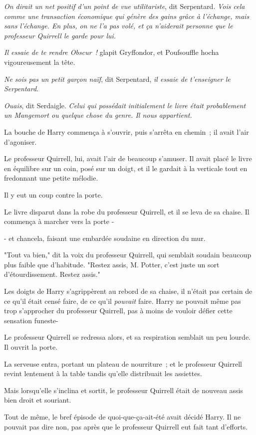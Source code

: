 \emph{On dirait un net positif d'un point de vue utilitariste}, dit Serpentard. \emph{Vois cela comme une transaction économique qui génère des gains grâce à l'échange, mais sans l'échange. En plus, on ne l'a pas volé, et ça n'aiderait personne que le professeur Quirrell le garde pour lui.}

\emph{Il essaie de te rendre Obscur~!} glapit Gryffondor, et Poufsouffle hocha vigoureusement la tête.

\emph{Ne sois pas un petit garçon naïf}, dit Serpentard, \emph{il essaie de t'enseigner le Serpentard}.

\emph{Ouais}, dit Serdaigle. \emph{Celui qui possédait initialement le livre était probablement un Mangemort ou quelque chose du genre. Il nous appartient.}

La bouche de Harry commença à s'ouvrir, puis s'arrêta en chemin~; il avait l'air d'agoniser.

Le professeur Quirrell, lui, avait l'air de beaucoup s'amuser. Il avait placé le livre en équilibre sur un coin, posé sur un doigt, et il le gardait à la verticale tout en fredonnant une petite mélodie.

Il y eut un coup contre la porte.

Le livre disparut dans la robe du professeur Quirrell, et il se leva de sa chaise. Il commença à marcher vers la porte -

- et chancela, faisant une embardée soudaine en direction du mur.

"Tout va bien," dit la voix du professeur Quirrell, qui semblait soudain beaucoup plus faible que d'habitude. "Restez assis, M. Potter, c'est juste un sort d'étourdissement. Restez assis."

Les doigts de Harry s'agrippèrent au rebord de sa chaise, il n'était pas certain de ce qu'il était censé faire, de ce qu'il \emph{pouvait} faire. Harry ne pouvait même pas trop s'approcher du professeur Quirrell, pas à moins de vouloir défier cette sensation funeste-

Le professeur Quirrell se redressa alors, et sa respiration semblait un peu lourde. Il ouvrit la porte.

La serveuse entra, portant un plateau de nourriture~; et le professeur Quirrell revint lentement à la table tandis qu'elle distribuait les assiettes.

Mais lorsqu'elle s'inclina et sortit, le professeur Quirrell était de nouveau assis bien droit et souriant.

Tout de même, le bref épisode de quoi-que-ça-ait-été avait décidé Harry. Il ne pouvait pas dire non, pas après que le professeur Quirrell eut fait tant d'efforts.

